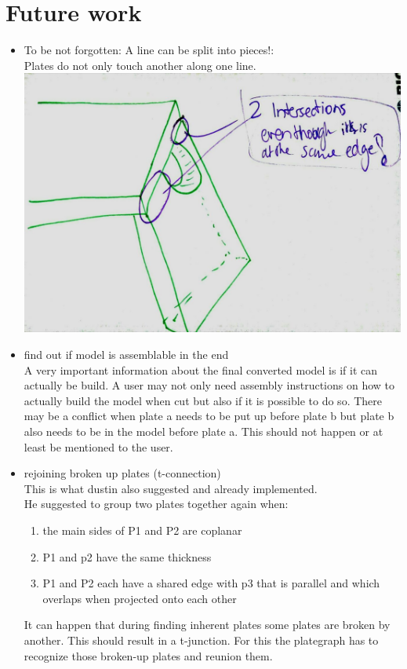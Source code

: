 \documentclass[../ClassicThesis.tex]{subfiles}
\begin{document}
\section{Future work}
\begin{itemize}
    \item To be not forgotten: A line can be split into pieces!:\\
    Plates do not only touch another along one line. \\
    \includegraphics[width=0.5\columnwidth]{Images/06-2-joints-moreThanOneLinePerEdge.jpg}
    \item find out if model is assemblable in the end\\
    A very important information about the final converted model is if it can actually be build. A user may not only need assembly instructions on how to actually build the model when cut but also if it is possible to do so. There may be a conflict when plate a needs to be put up before plate b but plate b also needs to be in the model before plate a. This should not happen or at least be mentioned to the user.
    \item rejoining broken up plates (t-connection)\\
    This is what dustin also suggested and already implemented.\\
    He suggested to group two plates together again when:\\
    \begin{enumerate}
        \item the main sides of P1 and P2 are coplanar
        \item P1 and p2 have the same thickness
        \item P1 and P2 each have a shared edge with p3 that is parallel and which overlaps when projected onto each other
    \end{enumerate}
    It can happen that during finding inherent plates some plates are broken by another. This should result in a t-junction. For this the plategraph has to recognize those broken-up plates and reunion them. \\

\end{itemize}
\end{document}
